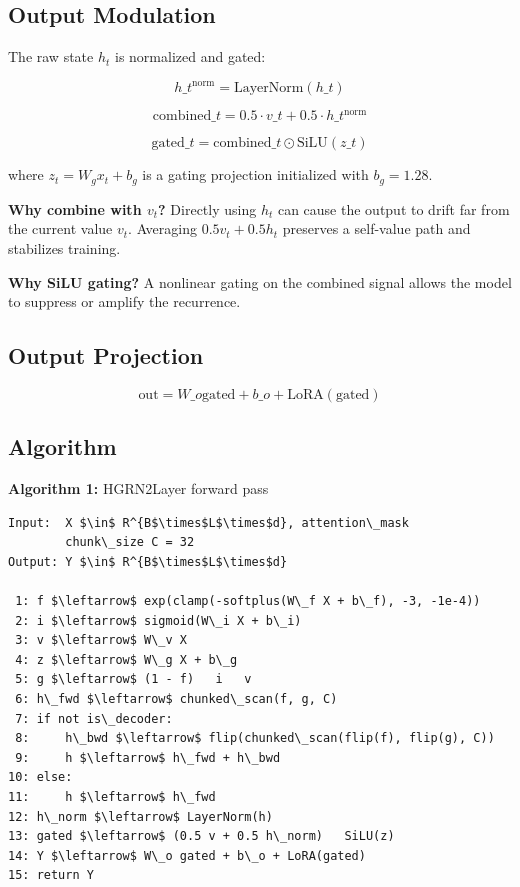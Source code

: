 \subsection{Output Modulation}

The raw state $h_t$ is normalized and gated:

\[
h\_t^\text{norm} = \text{LayerNorm}(h\_t)
\tag{4.15}
\]

\[
\text{combined}\_t = 0.5 \cdot v\_t + 0.5 \cdot h\_t^\text{norm}
\tag{4.16}
\]

\[
\text{gated}\_t = \text{combined}\_t \odot \text{SiLU}(z\_t)
\tag{4.17}
\]

where $z_t = W_g x_t + b_g$ is a gating projection initialized with $b_g = 1.28$.

\textbf{Why combine with $v_t$?} Directly using $h_t$ can cause the output to 
drift far from the current value $v_t$. Averaging $0.5 v_t + 0.5 h_t$ 
preserves a self-value path and stabilizes training.

\textbf{Why SiLU gating?} A nonlinear gating on the combined signal allows the 
model to suppress or amplify the recurrence.

\subsection{Output Projection}

\[
\text{out} = W\_o \text{gated} + b\_o + \text{LoRA}(\text{gated})
\tag{4.18}
\]

\subsection{Algorithm}

\textbf{Algorithm 1:} HGRN2Layer forward pass
\begin{lstlisting}
Input:  X $\in$ R^{B$\times$L$\times$d}, attention\_mask
        chunk\_size C = 32
Output: Y $\in$ R^{B$\times$L$\times$d}

 1: f $\leftarrow$ exp(clamp(-softplus(W\_f X + b\_f), -3, -1e-4))
 2: i $\leftarrow$ sigmoid(W\_i X + b\_i)
 3: v $\leftarrow$ W\_v X
 4: z $\leftarrow$ W\_g X + b\_g
 5: g $\leftarrow$ (1 - f)   i   v
 6: h\_fwd $\leftarrow$ chunked\_scan(f, g, C)
 7: if not is\_decoder:
 8:     h\_bwd $\leftarrow$ flip(chunked\_scan(flip(f), flip(g), C))
 9:     h $\leftarrow$ h\_fwd + h\_bwd
10: else:
11:     h $\leftarrow$ h\_fwd
12: h\_norm $\leftarrow$ LayerNorm(h)
13: gated $\leftarrow$ (0.5 v + 0.5 h\_norm)   SiLU(z)
14: Y $\leftarrow$ W\_o gated + b\_o + LoRA(gated)
15: return Y
\end{lstlisting}

